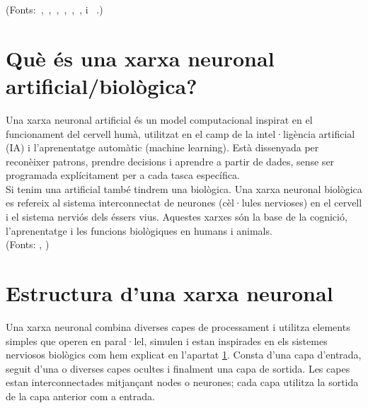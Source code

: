 (Fonts:~\cite{Universitat_oberta_catalunya},~\cite{Generalitat},~\cite{IBM_machine_learning},~\cite{Ultralytics},~\cite{bengio2012},~\cite{Ai_Act}, \cite{Algoritmes} i ~\cite{Unesco}.)

\section{Què és una xarxa neuronal artificial/biològica?}\label{sec:xarxa neuronal}

Una xarxa neuronal artificial és un model computacional inspirat en el funcionament del cervell humà, utilitzat en el camp de la intel·ligència artificial (IA) i l'aprenentatge automàtic (machine learning). Està dissenyada per reconèixer patrons, prendre decisions i aprendre a partir de dades, sense ser programada explícitament per a cada tasca específica.\\

Si tenim una artificial també tindrem una biològica. Una xarxa neuronal biològica es refereix al sistema interconnectat de neurones (cèl·lules nervioses) en el cervell i el sistema nerviós dels éssers vius. Aquestes xarxes són la base de la cognició, l'aprenentatge i les funcions biològiques en humans i animals.\\
(Fonts: \cite{UOC}, \cite{XarxaBiologica})
\section{Estructura d'una xarxa neuronal}\label{sec:3.6}

Una xarxa neuronal combina diverses capes de processament i utilitza elements simples que operen en paral·lel, simulen i estan inspirades en els sistemes nerviosos biològics com hem explicat en l'apartat \ref{sec:xarxa neuronal}. Consta d'una capa d'entrada, seguit d'una o diverses capes ocultes i finalment una capa de sortida. Les capes estan interconnectades mitjançant nodes o neurones; cada capa utilitza la sortida de la capa anterior com a entrada.


